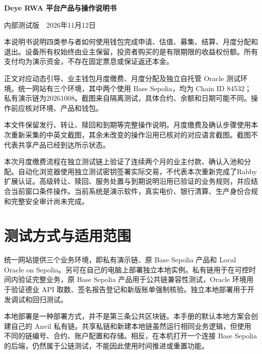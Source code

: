 \documentclass[12pt,a4paper]{article}
\begin{document}
\begin{center}\textbf{Deye RWA 平台产品与操作说明书}\end{center}
内部测试版　2026年11月12日

本说明书说明四类参与者如何使用钱包完成申请、估值、募集、结算、月度分配和退出。设备所有权始终由业主保留，投资者购买的是有限期限的收益权份额。所有支付均为演示资金，不存在固定票息或保证返还本金。

正文对应动态引导、业主钱包月度缴费、月度分配及独立自托管 Oracle 测试环境。统一网站有三个环境，其中两个使用 Base Sepolia，均为 Chain ID 84532；私有演示链为20261008。截图来自隔离测试，具体合约、余额和日期可能不同。操作前应核对环境、产品和钱包。

本文件保留发行、转让、赎回和到期等完整操作说明。月度缴费及确认步骤使用本次重新采集的中英文截图，其余未改变的操作沿用已核对的对应语言截图。截图不代表共享产品已经到达所示状态。

本次月度缴费流程在独立测试链上验证了连续两个月的业主付款、确认入池和分配。自动化浏览器使用独立测试密钥签署实际交易，不代表本次重新完成了Rabby扩展认证。高级转让、赎回、服务处置与到期说明沿用已验证的业务规则，并应结合当前窗口条件操作。当前系统是演示软件，真实电价、银行清算、生产身份合规和完整安全审计尚未完成。

\renewcommand{\contentsname}{目录}\clearpage\tableofcontents
\clearpage\section{测试方式与适用范围}
统一网站提供三个业务环境，即私有演示链、原 Base Sepolia 产品和 Local Oracle on Sepolia。另可在自己的电脑上部署独立本地实例。私有链用于在可控时间内验证完整业务，原 Base Sepolia 产品用于公共链兼容性测试，Oracle 环境用于验证德业 API 取数、签名报告登记和新版账单强制核验。独立本地部署用于开发调试和回归测试。

本地部署是一种部署方式，并不是第三条公共区块链。本手册的默认本地方案会创建自己的 Anvil 私有链。共享私链和新建本地链虽然运行相同业务逻辑，但使用不同的链编号、合约、账户配置和存储。相反，在本机打开一个连接 Base Sepolia 的后端，仍然属于公链测试，不能因此使用时间推进或重置功能。
\end{document}
